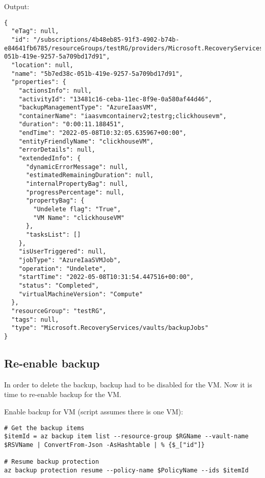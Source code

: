 Output:
\begin{verbatim}
{
  "eTag": null,
  "id": "/subscriptions/4b48eb85-91f3-4902-b74b-e84641fb6785/resourceGroups/testRG/providers/Microsoft.RecoveryServices/vaults/myRSV/backupJobs/5b7ed38c-051b-419e-9257-5a709bd17d91",
  "location": null,
  "name": "5b7ed38c-051b-419e-9257-5a709bd17d91",
  "properties": {
    "actionsInfo": null,
    "activityId": "13481c16-ceba-11ec-8f9e-0a580af44d46",
    "backupManagementType": "AzureIaasVM",
    "containerName": "iaasvmcontainerv2;testrg;clickhousevm",
    "duration": "0:00:11.188451",
    "endTime": "2022-05-08T10:32:05.635967+00:00",
    "entityFriendlyName": "clickhouseVM",
    "errorDetails": null,
    "extendedInfo": {
      "dynamicErrorMessage": null,
      "estimatedRemainingDuration": null,
      "internalPropertyBag": null,
      "progressPercentage": null,
      "propertyBag": {
        "Undelete flag": "True",
        "VM Name": "clickhouseVM"
      },
      "tasksList": []
    },
    "isUserTriggered": null,
    "jobType": "AzureIaaSVMJob",
    "operation": "Undelete",
    "startTime": "2022-05-08T10:31:54.447516+00:00",
    "status": "Completed",
    "virtualMachineVersion": "Compute"
  },
  "resourceGroup": "testRG",
  "tags": null,
  "type": "Microsoft.RecoveryServices/vaults/backupJobs"
}
\end{verbatim}
\subsection{Re-enable backup}
\label{sec:org8712338}
In order to delete the backup,
backup had to be disabled for the VM.
Now it is time to re-enable backup for the VM.

Enable backup for VM (script assumes there is one VM):
\begin{verbatim}
# Get the backup items
$itemId = az backup item list --resource-group $RGName --vault-name $RSVName | ConvertFrom-Json -AsHashtable | % {$_["id"]}

# Resume backup protection
az backup protection resume --policy-name $PolicyName --ids $itemId
\end{verbatim}

